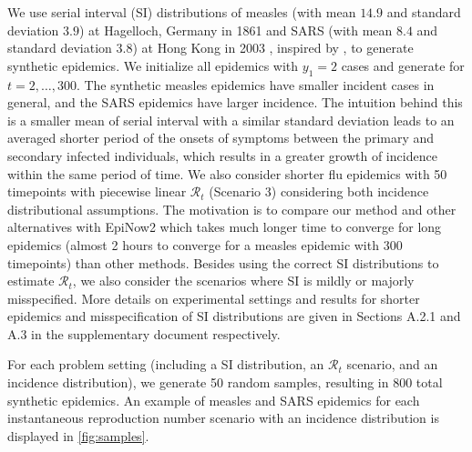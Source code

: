 \documentclass[10pt,letterpaper]{article}
\def\calR{\mathcal{R}}
\begin{document}
We use serial interval (SI) distributions of measles (with mean $14.9$ and
standard deviation $3.9$) at Hagelloch, Germany in 1861
\cite{groendyke2011bayesian} and SARS (with mean $8.4$ and standard deviation
$3.8$) at Hong Kong in 2003 \cite{lipsitch2003transmission}, inspired by
\cite{cori2013new}, to generate synthetic epidemics. We initialize all epidemics
with $y_1=2$ cases and generate for $t=2,\ldots,300$. The synthetic measles
epidemics have smaller incident cases in general, and the SARS epidemics have
larger incidence. The intuition behind this is a smaller mean of serial interval
with a similar standard deviation leads to an averaged shorter period of the
onsets of symptoms between the primary and secondary infected individuals, which
results in a greater growth of incidence within the same period of time. We also
consider shorter flu epidemics with 50 timepoints with piecewise linear
$\calR_t$ (Scenario 3) considering both incidence distributional assumptions.
The motivation is to compare our method and other alternatives with EpiNow2
which takes much longer time to converge for long epidemics (almost 2 hours to
converge for a measles epidemic with 300 timepoints) than other methods.  
Besides using the correct SI distributions to estimate $\calR_t$, we also consider 
the scenarios where SI is mildly or majorly misspecified. 
More details on experimental settings and results for shorter epidemics and misspecification 
of SI distributions are given in Sections A.2.1 and A.3 in the supplementary document respectively. 

For each problem setting (including a SI distribution, an $\calR_t$ scenario, 
and an incidence distribution), we generate 50 random samples, resulting in 
$800$ total synthetic epidemics. 
An example of measles and SARS epidemics for each instantaneous reproduction number scenario
with an incidence distribution is displayed in \autoref{fig:samples}. 
\end{document}
